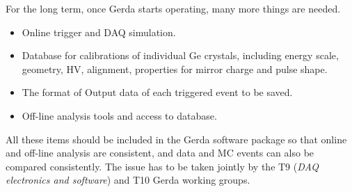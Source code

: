 \documentclass[a4paper,12pt,twoside]{article}
\begin{document}
For the long term, once Gerda starts operating, many more things are needed.
\begin{itemize}
\item Online trigger and DAQ simulation.
\item Database for calibrations of individual Ge crystals,
including energy scale, geometry, HV, alignment, properties
for mirror charge and pulse shape.
\item The format of Output data of each triggered event to be saved.
\item Off-line analysis tools and access to database.
\end{itemize}

All these items should be included in the Gerda software package
so that online and off-line analysis are consistent, and
data and MC events can also be compared consistently. The issue
has to be taken jointly by the T9 (\emph{DAQ electronics and
software}) and T10 Gerda working groups.
\end{document}
